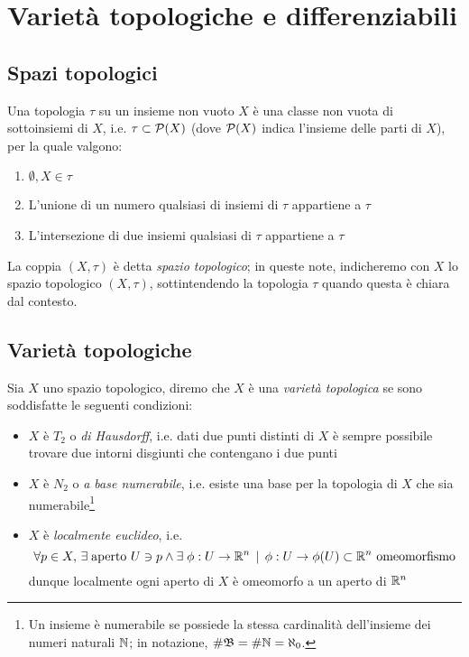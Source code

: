 \section{Varietà topologiche e differenziabili}

\subsection{Spazi topologici}

Una topologia $ \tau $ su un insieme non vuoto $ X $ è una classe non vuota di sottoinsiemi di $ X $, i.e. $ \tau \subset \mathcal{P}(X) $ (dove $ \mathcal{P}(X) $ indica l'insieme delle parti di $ X $), per la quale valgono:

\begin{enumerate}
	\item $ \emptyset, X \in \tau $
	
	\item L'unione di un numero qualsiasi di insiemi di $ \tau $ appartiene a $ \tau $
	
	\item L'intersezione di due insiemi qualsiasi di $ \tau $ appartiene a $ \tau $
\end{enumerate}

La coppia $ (X, \tau) $ è detta \textit{spazio topologico}; in queste note, indicheremo con $ X $ lo spazio topologico $ (X, \tau) $, sottintendendo la topologia $ \tau $ quando questa è chiara dal contesto.

\subsection{Varietà topologiche}

Sia $ X $ uno spazio topologico, diremo che $ X $ è una \textit{varietà topologica} se sono soddisfatte le seguenti condizioni:

\begin{itemize}
	\item $ X $ è $ T_{2} $ o \textit{di Hausdorff}, i.e. dati due punti distinti di $ X $ è sempre possibile trovare due intorni disgiunti che contengano i due punti
	
	\item $ X $ è $ N_{2} $ o \textit{a base numerabile}, i.e. esiste una base per la topologia di $ X $ che sia numerabile\footnote{%
		Un insieme è numerabile se possiede la stessa cardinalità dell'insieme dei numeri naturali $ \mathbb{N} $; in notazione, $ \# \mathfrak{B} = \# \mathbb{N} = \aleph_{0} $.}
	
	\item $ X $ è \textit{localmente euclideo}, i.e. 
		\begin{equation}
			\forall p \in X, \, \exists \; \text{aperto } U \ni p \wedge \exists \; \phi : U \to \mathbb{R}^{n} \, \mid \, \phi : U \to \phi(U) \subset \mathbb{R}^{n} \text{ omeomorfismo}
		\end{equation}
		dunque localmente ogni aperto di $ X $ è omeomorfo a un aperto di $ \mathbb{R}^{n} $
\end{itemize}

